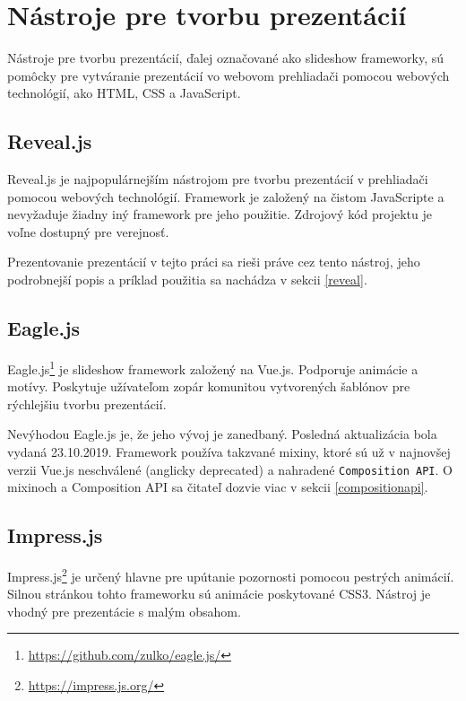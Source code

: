 \section{Nástroje pre tvorbu prezentácií}
Nástroje pre tvorbu prezentácií, ďalej označované ako slideshow frameworky, sú pomôcky pre vytváranie prezentácií vo webovom prehliadači pomocou webových technológií, ako HTML, CSS a JavaScript.

\subsection{Reveal.js}
Reveal.js je najpopulárnejším nástrojom pre tvorbu prezentácií v prehliadači pomocou webových technológií. Framework je založený na čistom JavaScripte a nevyžaduje žiadny iný framework pre jeho použitie. Zdrojový kód projektu je voľne dostupný pre verejnosť. 

Prezentovanie prezentácií v tejto práci sa rieši práve cez tento nástroj, jeho podrobnejší popis a príklad použitia sa nachádza v sekcii \ref{reveal}.

\subsection{Eagle.js}
Eagle.js\footnote{\url{https://github.com/zulko/eagle.js/}} je slideshow framework založený na Vue.js. Podporuje animácie a motívy. Poskytuje užívateľom zopár komunitou vytvorených šablónov pre rýchlejšiu tvorbu prezentácií. 

Nevýhodou Eagle.js je, že jeho vývoj je zanedbaný. Posledná aktualizácia bola vydaná 23.10.2019. Framework používa takzvané mixiny, ktoré sú už v najnovšej verzii Vue.js neschválené (anglicky deprecated) a nahradené \texttt{Composition API}. O mixinoch a Composition API sa čitateľ dozvie viac v sekcii \ref{compositionapi}.

\subsection{Impress.js}
Impress.js\footnote{\url{https://impress.js.org/}} je určený hlavne pre upútanie pozornosti pomocou pestrých animácií. Silnou stránkou tohto frameworku sú animácie poskytované CSS3. Nástroj je vhodný pre prezentácie s malým obsahom.
